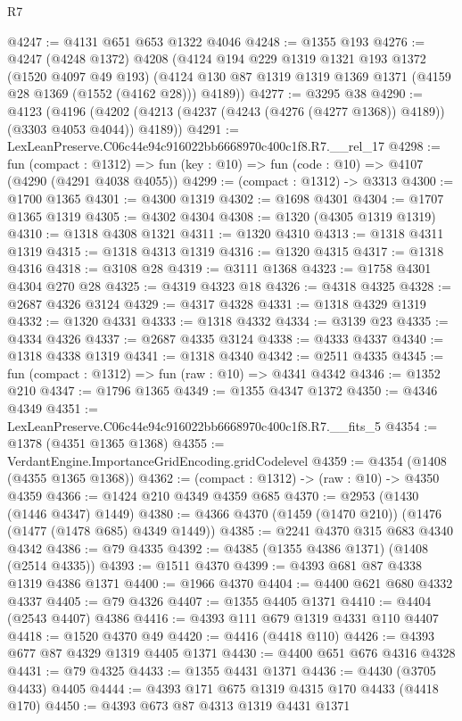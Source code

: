 \begin{lexlean}{R7}
\begin{coremodule}
@4247 := @4131 @651 @653 @1322 @4046
@4248 := @1355 @193
@4276 := @4247
    (@4248 @1372)
    @4208
    (@4124
      @194
      @229
      @1319
      @1321
      @193
      @1372
      (@1520 @4097 @49 @193)
      (@4124 @130 @87 @1319 @1319 @1369 @1371 (@4159 @28 @1369 (@1552 (@4162 @28))) @4189))
@4277 := @3295 @38
@4290 := @4123
    (@4196 (@4202 (@4213 (@4237 (@4243 (@4276 (@4277 @1368)) @4189)) (@3303 @4053 @4044)) @4189))
@4291 := LexLeanPreserve.C06c44e94c916022bb6668970c400c1f8.R7.__rel_17
@4298 := fun (compact : @1312) =>
  fun (key : @10) => fun (code : @10) => @4107 (@4290 (@4291 @4038 @4055))
@4299 := (compact : @1312) -> @3313
@4300 := @1700 @1365
@4301 := @4300 @1319
@4302 := @1698 @4301
@4304 := @1707 @1365 @1319
@4305 := @4302 @4304
@4308 := @1320 (@4305 @1319 @1319)
@4310 := @1318 @4308 @1321
@4311 := @1320 @4310
@4313 := @1318 @4311 @1319
@4315 := @1318 @4313 @1319
@4316 := @1320 @4315
@4317 := @1318 @4316
@4318 := @3108 @28
@4319 := @3111 @1368
@4323 := @1758 @4301 @4304 @270 @28
@4325 := @4319 @4323 @18
@4326 := @4318 @4325
@4328 := @2687 @4326 @3124
@4329 := @4317 @4328
@4331 := @1318 @4329 @1319
@4332 := @1320 @4331
@4333 := @1318 @4332
@4334 := @3139 @23
@4335 := @4334 @4326
@4337 := @2687 @4335 @3124
@4338 := @4333 @4337
@4340 := @1318 @4338 @1319
@4341 := @1318 @4340
@4342 := @2511 @4335
@4345 := fun (compact : @1312) => fun (raw : @10) => @4341 @4342
@4346 := @1352 @210
@4347 := @1796 @1365
@4349 := @1355 @4347 @1372
@4350 := @4346 @4349
@4351 := LexLeanPreserve.C06c44e94c916022bb6668970c400c1f8.R7.__fits_5
@4354 := @1378 (@4351 @1365 @1368)
@4355 := VerdantEngine.ImportanceGridEncoding.gridCodelevel
@4359 := @4354 (@1408 (@4355 @1365 @1368))
@4362 := (compact : @1312) -> (raw : @10) -> @4350 @4359
@4366 := @1424 @210 @4349 @4359 @685
@4370 := @2953 (@1430 (@1446 @4347) @1449)
@4380 := @4366 @4370 (@1459 (@1470 @210)) (@1476 (@1477 (@1478 @685) @4349 @1449))
@4385 := @2241 @4370 @315 @683 @4340 @4342
@4386 := @79 @4335
@4392 := @4385 (@1355 @4386 @1371) (@1408 (@2514 @4335))
@4393 := @1511 @4370
@4399 := @4393 @681 @87 @4338 @1319 @4386 @1371
@4400 := @1966 @4370
@4404 := @4400 @621 @680 @4332 @4337
@4405 := @79 @4326
@4407 := @1355 @4405 @1371
@4410 := @4404 (@2543 @4407) @4386
@4416 := @4393 @111 @679 @1319 @4331 @110 @4407
@4418 := @1520 @4370 @49
@4420 := @4416 (@4418 @110)
@4426 := @4393 @677 @87 @4329 @1319 @4405 @1371
@4430 := @4400 @651 @676 @4316 @4328
@4431 := @79 @4325
@4433 := @1355 @4431 @1371
@4436 := @4430 (@3705 @4433) @4405
@4444 := @4393 @171 @675 @1319 @4315 @170 @4433 (@4418 @170)
@4450 := @4393 @673 @87 @4313 @1319 @4431 @1371

\end{coremodule}
\end{lexlean}
